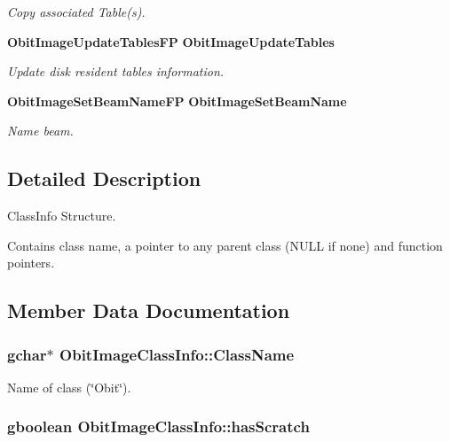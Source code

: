 \begin{CompactItemize}
\begin{CompactList}\small\item\em Copy associated Table(s). \item\end{CompactList}\item 
{\bf Obit\-Image\-Update\-Tables\-FP} {\bf Obit\-Image\-Update\-Tables}
\begin{CompactList}\small\item\em Update disk resident tables information. \item\end{CompactList}\item 
{\bf Obit\-Image\-Set\-Beam\-Name\-FP} {\bf Obit\-Image\-Set\-Beam\-Name}
\begin{CompactList}\small\item\em Name beam. \item\end{CompactList}\end{CompactItemize}


\subsection{Detailed Description}
Class\-Info Structure. 

Contains class name, a pointer to any parent class (NULL if none) and function pointers. 



\subsection{Member Data Documentation}
\subsubsection{\setlength{\rightskip}{0pt plus 5cm}gchar$\ast$ {\bf Obit\-Image\-Class\-Info::Class\-Name}}\label{structObitImageClassInfo_o2}


Name of class (\char`\"{}Obit\char`\"{}). 

\subsubsection{\setlength{\rightskip}{0pt plus 5cm}gboolean {\bf Obit\-Image\-Class\-Info::has\-Scratch}}\label{structObitImageClassInfo_o1}


